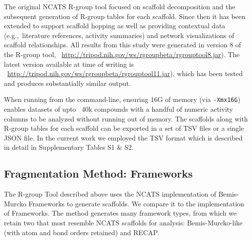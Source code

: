 \documentclass[journal=jacsat,manuscript=article]{achemso}
\newcommand*\sref[1]{Section~\ref{sec:#1}}
\newcommand*\eg{e.g.,~}
\begin{document}
The original NCATS R-group tool focused on scaffold decomposition and
the subsequent generation of R-group tables for each scaffold. Since
then it has been extended to support scaffold hopping as well as
providing contextual data (\eg literature references, activity
summaries) and network visualizations of scaffold relationships. All
results from this study were generated in version 8 of the R-group tool,
~\url{http://tripod.nih.gov/ws/rgroupbeta/rgrouptool8.jar}). The
latest version available at time of writing is
~\url{http://tripod.nih.gov/ws/rgroupbeta/rgrouptool11.jar}), which has been
tested and produces substantially similar output.

When running from the command-line, ensuring 16G of memory (via
\texttt{-Xmx16G}) enables datasets of upto ~40k compounds with a
handful of numeric activity columns to be analyzed without running out
of memory. The scaffolds along with R-group tables for each scaffold
can be exported in a set of TSV files or a single JSON file. In the
current work we employed the TSV format which is described in detail
in Supplementary Tables S1 \& S2.

\subsection{Fragmentation Method: Frameworks}
\label{sec:gskframe}
The R-group Tool described above uses the NCATS implementation of
Bemis-Murcko Frameworks to generate scaffolds. We compare it to the
\citet{Harper2004DDclus} implementation of Frameworks.
The method generates many framework types, from which we retain two that
most resemble NCATS scaffolds for analysis: Bemis-Murcko-like\cite{BemisMurcko1996}
(with atom and bond orders retained) and RECAP\cite{Lewell:1998aa}. 


\end{document}
